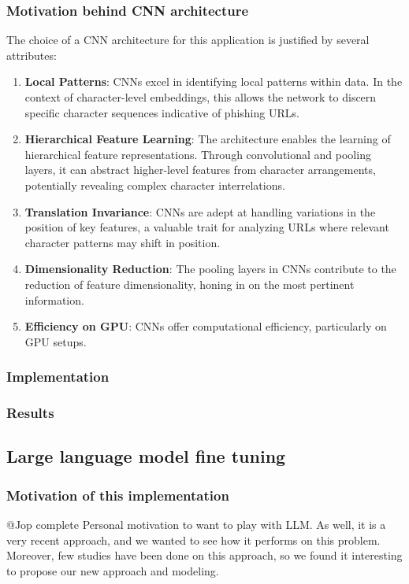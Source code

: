 \documentclass{article}
\begin{document}
    \subsubsection{Motivation behind CNN architecture}

    The choice of a CNN architecture for this application is justified by several attributes:
    \begin{enumerate}
        \item \textbf{Local Patterns}: CNNs excel in identifying local patterns within data.
        In the context of character-level embeddings, this allows the network to discern specific character sequences indicative of phishing URLs.
        \item \textbf{Hierarchical Feature Learning}: The architecture enables the learning of hierarchical feature representations.
        Through convolutional and pooling layers, it can abstract higher-level features from character arrangements, potentially revealing complex character interrelations.
        \item \textbf{Translation Invariance}: CNNs are adept at handling variations in the position of key features, a valuable trait for analyzing URLs where relevant character patterns may shift in position.
        \item \textbf{Dimensionality Reduction}: The pooling layers in CNNs contribute to the reduction of feature dimensionality, honing in on the most pertinent information.
        \item \textbf{Efficiency on GPU}: CNNs offer computational efficiency, particularly on GPU setups.
    \end{enumerate}

    \subsubsection{Implementation}

    \subsubsection{Results}

    \subsection{Large language model fine tuning}\label{subsec:large-language-model-finetuning}

    \subsubsection{Motivation of this implementation}
    @Jop complete
    Personal motivation to want to play with LLM. As well, it is a very recent approach, and we wanted to see how it performs on this problem.
    Moreover, few studies have been done on this approach, so we found it interesting to propose our new approach and modeling.
\end{document}
